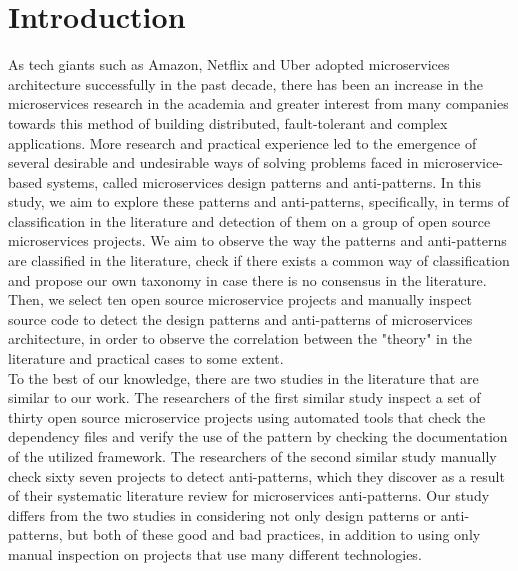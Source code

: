 \documentclass[11pt,a4paper,twocolumn]{article}
\begin{document}



\section{Introduction}
\label{sec:introduction}

As tech giants such as Amazon, Netflix and Uber adopted microservices architecture successfully in the past decade, there has been an increase in the microservices research in the academia and greater interest from many companies towards this method of building distributed, fault-tolerant and complex applications.
More research and practical experience led to the emergence of several desirable and undesirable ways of solving problems faced in microservice-based systems, called microservices design patterns and anti-patterns.
In this study, we aim to explore these patterns and anti-patterns, specifically, in terms of classification in the literature and detection of them on a group of open source microservices projects.
We aim to observe the way the patterns and anti-patterns are classified in the literature, check if there exists a common way of classification and propose our own taxonomy in case there is no consensus in the literature.
Then, we select ten open source microservice projects and manually inspect source code to detect the design patterns and anti-patterns of microservices architecture, in order to observe the correlation between the "theory" in the literature and practical cases to some extent.
\\
To the best of our knowledge, there are two studies in the literature that are similar to our work.
The researchers of the first similar study\cite{8719492} inspect a set of thirty open source microservice projects using automated tools that check the dependency files and verify the use of the pattern by checking the documentation of the utilized framework.
The researchers of the second similar study\cite{10.1145/3424771.3424812} manually check sixty seven projects to detect anti-patterns, which they discover as a result of their systematic literature review for microservices anti-patterns.
Our study differs from the two studies in considering not only design patterns or anti-patterns, but both of these good and bad practices, in addition to using only manual inspection on projects that use many different technologies.
\end{document}
